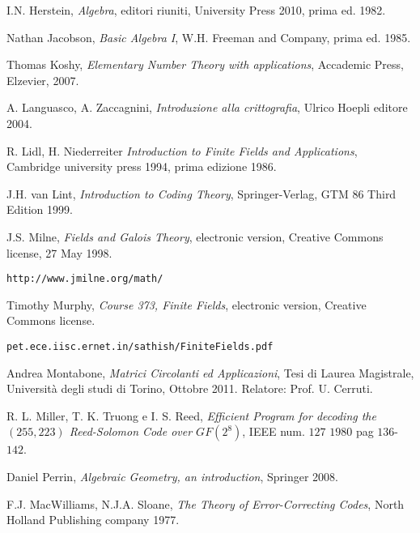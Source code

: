 \begin{thebibliography}{25}





I.N. Herstein, \emph{Algebra},
editori riuniti, University Press 2010, prima ed. 1982.

Nathan Jacobson, \emph{Basic Algebra I}, W.H. Freeman and Company, prima ed. 1985.

Thomas Koshy, \emph{Elementary Number Theory with applications}, Accademic Press, Elzevier, 2007.

A. Languasco, A. Zaccagnini, \emph{Introduzione alla crittografia}, Ulrico Hoepli editore 2004.

R. Lidl, H. Niederreiter \emph{Introduction to Finite Fields and Applications},
Cambridge university press 1994, prima edizione 1986.

J.H. van Lint, \emph{Introduction to Coding Theory},
Springer-Verlag, GTM 86 Third Edition 1999.

J.S. Milne, \emph{Fields and Galois Theory}, electronic version,
Creative
Commons license, 27 May 1998.
\begin{verbatim}
http://www.jmilne.org/math/
\end{verbatim}

Timothy Murphy, \emph{Course 373, Finite Fields}, electronic version, Creative Commons license.
\begin{verbatim}
pet.ece.iisc.ernet.in/sathish/FiniteFields.pdf
\end{verbatim}

Andrea Montabone, \emph{Matrici Circolanti ed Applicazioni},
Tesi di Laurea Magistrale, Università degli studi di Torino, Ottobre 2011.
Relatore: Prof. U. Cerruti.

R. L. Miller, T. K. Truong e I. S. Reed, \emph{Efficient Program for decoding the $(255,223)$ Reed-Solomon Code over $GF(2^{8})$}, IEEE num. $127$ $1980$ pag $136$-$142$.

Daniel Perrin, \emph{Algebraic Geometry, an introduction}, Springer 2008.

F.J. MacWilliams, N.J.A. Sloane, \emph{The Theory of Error-Correcting Codes},
North Holland Publishing company 1977.


\end{thebibliography}
